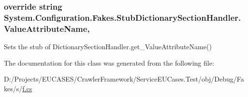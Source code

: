 \hypertarget{class_system_1_1_configuration_1_1_fakes_1_1_stub_dictionary_section_handler_a514aaa985f34188afee5754aa0bde071}{
\subsubsection[{Value\-Attribute\-Name}]{\setlength{\rightskip}{0pt plus 5cm}override string System.\-Configuration.\-Fakes.\-Stub\-Dictionary\-Section\-Handler.\-Value\-Attribute\-Name\hspace{0.3cm}{\ttfamily [get]}, {\ttfamily [protected]}}}\label{class_system_1_1_configuration_1_1_fakes_1_1_stub_dictionary_section_handler_a514aaa985f34188afee5754aa0bde071}


Sets the stub of Dictionary\-Section\-Handler.\-get\-\_\-\-Value\-Attribute\-Name()



The documentation for this class was generated from the following file\-:\begin{DoxyCompactItemize}
\item 
D\-:/\-Projects/\-E\-U\-C\-A\-S\-E\-S/\-Crawler\-Framework/\-Service\-E\-U\-Cases.\-Test/obj/\-Debug/\-Fakes/s/\hyperlink{s_2f_8cs}{f.\-cs}\end{DoxyCompactItemize}
